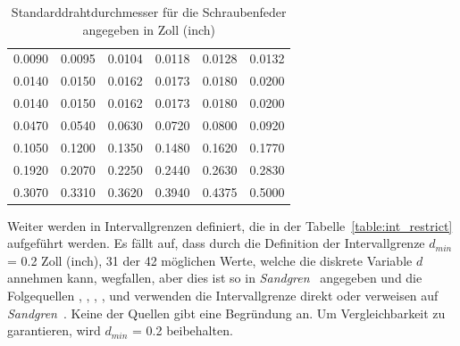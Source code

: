 \documentclass[fontsize=12, a4aper]{scrartcl}
\begin{document}
	\begin{table}[H]
		
		\fontsize{10pt}{12pt}
		
		\caption{Standarddrahtdurchmesser für die Schraubenfeder angegeben in Zoll (inch)}
		
		\label{table:d_values}
		
		\begin{center}
		
			\begin{tabular}{c c c c c c}
				
				\hline
				
				0.0090 & 0.0095 & 0.0104 & 0.0118 & 0.0128 & 0.0132\\
				
				0.0140 & 0.0150 & 0.0162 & 0.0173 & 0.0180 & 0.0200\\
				
				0.0140 & 0.0150 & 0.0162 & 0.0173 & 0.0180 & 0.0200\\
				
				0.0470 & 0.0540 & 0.0630 & 0.0720 & 0.0800 & 0.0920\\
				
				0.1050 & 0.1200 & 0.1350 & 0.1480 & 0.1620 & 0.1770\\
				
				0.1920 & 0.2070 & 0.2250 & 0.2440 & 0.2630 & 0.2830\\
				
				0.3070 & 0.3310 & 0.3620 & 0.3940 & 0.4375 & 0.5000\\
				
				\hline
				
			\end{tabular}
		
		\end{center}
		
	\end{table}
	
	\noindent Weiter werden in \cite{ACO_2013} Intervallgrenzen definiert, die in der Tabelle~\ref{table:int_restrict} aufgeführt werden. Es fällt auf, dass durch die Definition der Intervallgrenze \(d_{min}\) = 0.2 Zoll (inch), 31 der 42 möglichen Werte, welche die diskrete Variable \(d\) annehmen kann, wegfallen, aber dies ist so in \textit{Sandgren}~\cite{sandgren1990nonlinear} angegeben und die Folgequellen \cite{deb1998flexible}, \cite{Lampinen1999MIXEDIO}, \cite{guo2004swarm}, \cite{gong2022novel}, \cite{kannan1994augmented} und \cite{ACO_2013} verwenden die Intervallgrenze direkt oder verweisen auf \textit{Sandgren}~\cite{sandgren1990nonlinear}. Keine der Quellen gibt eine Begründung an. Um Vergleichbarkeit zu garantieren, wird \(d_{min}\) = 0.2 beibehalten.
	
\end{document}
